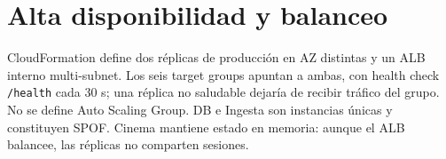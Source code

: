 \chapter{Alta disponibilidad y balanceo}CloudFormation define dos réplicas de producción en AZ distintas y un ALB interno multi-subnet. Los seis target groups apuntan a ambas, con health check \texttt{/health} cada 30 s; una réplica no saludable dejaría de recibir tráfico del grupo. No se define Auto Scaling Group. DB e Ingesta son instancias únicas y constituyen SPOF. Cinema mantiene estado en memoria: aunque el ALB balancee, las réplicas no comparten sesiones.
